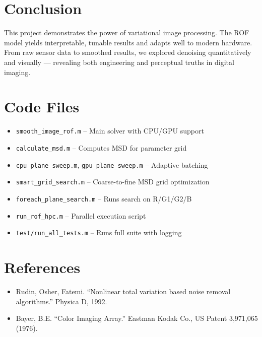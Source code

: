\documentclass[11pt]{article}
\begin{document}
\section*{Conclusion}
This project demonstrates the power of variational image processing. The ROF model yields interpretable, tunable results and adapts well to modern hardware. From raw sensor data to smoothed results, we explored denoising quantitatively and visually — revealing both engineering and perceptual truths in digital imaging.

\appendix
\section*{Code Files}
\begin{itemize}
  \item \texttt{smooth\_image\_rof.m} – Main solver with CPU/GPU support
  \item \texttt{calculate\_msd.m} – Computes MSD for parameter grid
  \item \texttt{cpu\_plane\_sweep.m}, \texttt{gpu\_plane\_sweep.m} – Adaptive batching
  \item \texttt{smart\_grid\_search.m} – Coarse-to-fine MSD grid optimization
  \item \texttt{foreach\_plane\_search.m} – Runs search on R/G1/G2/B
  \item \texttt{run\_rof\_hpc.m} – Parallel execution script
  \item \texttt{test/run\_all\_tests.m} – Runs full suite with logging
\end{itemize}

\section*{References}
\begin{itemize}
  \item Rudin, Osher, Fatemi. “Nonlinear total variation based noise removal algorithms.” Physica D, 1992.
  \item Bayer, B.E. “Color Imaging Array.” Eastman Kodak Co., US Patent 3,971,065 (1976).
\end{itemize}
\end{document}
